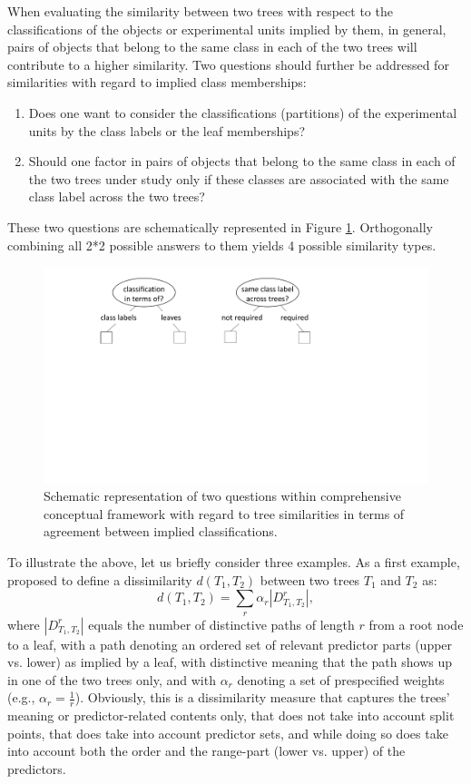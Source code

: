 When evaluating the similarity between two trees with respect to the classifications of the objects or experimental units implied by them, in general, pairs of objects that belong to the same class in each of the two trees will contribute to a higher similarity. Two questions should further be addressed for similarities with regard to implied class memberships:
\begin{enumerate}
\item{Does one want to consider the classifications (partitions) of the experimental units by the class labels or the leaf memberships?}
\item{Should one factor in pairs of objects that belong to the same class in each of the two trees under study only if these classes are associated with the same class label across the two trees?}
\end{enumerate}
These two questions are schematically represented in Figure \ref{figSim2}. Orthogonally combining all 2*2 possible answers to them yields 4 possible similarity types.


\begin{figure}[H]
		\includegraphics[width=\linewidth, trim=0 11cm 0 0, clip]{similarities.pdf}
	\caption{Schematic representation of two questions within comprehensive conceptual framework with regard to tree similarities in terms of agreement between implied classifications.}
	\label{figSim2}
\end{figure}


To illustrate the above, let us briefly consider three examples. As a first example, \citet{Shannon1999} proposed to define a dissimilarity $d(T_1, T_2)$  between two trees $T_1$ and  $T_2$ as:
\begin{equation}
d(T_1, T_2) = \sum_{r}{\alpha_r |D^r_{T_1,T_2}|},
\end{equation}
where $|D^r_{T_1,T_2}|$ equals the number of distinctive paths of length $r$ from a root node to a leaf, with a path denoting an ordered set of relevant predictor parts (upper vs. lower) as implied by a leaf, with distinctive meaning that the path shows up in one of the two trees only, and with $\alpha_r$ denoting a set of prespecified weights (e.g., $\alpha_r = \frac{1}{r}$). Obviously, this is a dissimilarity measure that captures the trees' meaning or predictor-related contents only, that does not take into account split points, that does take into account predictor sets, and while doing so does take into account both the order and the range-part (lower vs. upper) of the predictors.

